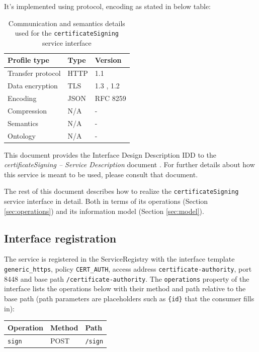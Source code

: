 \documentclass[a4paper]{arrowhead}
\begin{document}
It's implemented using protocol, encoding as stated in below table:
\begin{table}[ht!]
  \centering
  \begin{tabular}{|l|l|l|}
    \hline
    \rowcolor{gray!33} Profile type & Type & Version \\ \hline
    Transfer protocol & HTTP & 1.1 \cite{rfc9112} \\ \hline
    Data encryption & TLS & 1.3 \cite{rfc8446}, 1.2 \cite{rfc5246} \\ \hline
    Encoding & JSON & RFC 8259 \cite{rfc8259} \\ \hline
    Compression & N/A & - \\ \hline
    Semantics & N/A & - \\ \hline
    Ontology & N/A & - \\ \hline
  \end{tabular}
  \caption{Communication and semantics details used for the \texttt{certificateSigning} service interface}
  \label{tab:comunication_semantics_profile}
\end{table}

This document provides the Interface Design Description IDD to the \textit{certificateSigning -- Service Description} document \cite{cau-certificateSigning-sd}.
For further details about how this service is meant to be used, please consult that document.

The rest of this document describes how to realize the \texttt{certificateSigning} service
interface in detail. Both in terms of its operations (Section \ref{sec:operations}) and its information model (Section \ref{sec:model}).

\subsection{Interface registration}

The service is registered in the ServiceRegistry with the interface template \texttt{generic\_\allowbreak{}https}, policy \texttt{CERT\_\allowbreak{}AUTH}, access address \texttt{certificate-\allowbreak{}authority}, port 8448 and base path \texttt{/\allowbreak{}certificate-\allowbreak{}authority}. The \texttt{operations} property of the interface lists the operations below with their method and path relative to the base path (path parameters are placeholders such as \texttt{\{id\}} that the consumer fills in):

\noindent\begin{longtable}{| p{5.2cm} | p{1.6cm} | p{8.4cm} |} \hline
\rowcolor{gray!33} Operation & Method & Path \\ \hline \endhead
\texttt{sign} & POST & \texttt{/\allowbreak{}sign} \\ \hline
\end{longtable}
\end{document}
